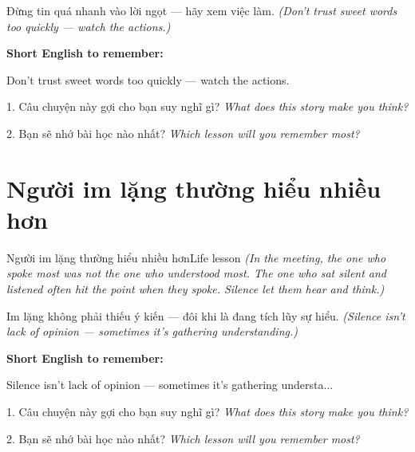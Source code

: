 \begin{baihoc}
Đừng tin quá nhanh vào lời ngọt — hãy xem việc làm.
\textit{(Don't trust sweet words too quickly — watch the actions.)}
\end{baihoc}

\begin{ghinhoanh}
\textbf{Short English to remember:}

Don't trust sweet words too quickly — watch the actions.

\end{ghinhoanh}

\begin{tuhocnhanh}
1. Câu chuyện này gợi cho bạn suy nghĩ gì? \textit{What does this story make you think?}

2. Bạn sẽ nhớ bài học nào nhất? \textit{Which lesson will you remember most?}
\end{tuhocnhanh}
\ngancach


\section{Người im lặng thường hiểu nhiều hơn}
\begin{truyen}{Người im lặng thường hiểu nhiều hơn}{Life lesson}
\textit{(In the meeting, the one who spoke most was not the one who understood most. The one who sat silent and listened often hit the point when they spoke. Silence let them hear and think.)}
\end{truyen}

\begin{baihoc}
Im lặng không phải thiếu ý kiến — đôi khi là đang tích lũy sự hiểu.
\textit{(Silence isn't lack of opinion — sometimes it's gathering understanding.)}
\end{baihoc}

\begin{ghinhoanh}
\textbf{Short English to remember:}

Silence isn't lack of opinion — sometimes it's gathering understa...

\end{ghinhoanh}

\begin{tuhocnhanh}
1. Câu chuyện này gợi cho bạn suy nghĩ gì? \textit{What does this story make you think?}

2. Bạn sẽ nhớ bài học nào nhất? \textit{Which lesson will you remember most?}
\end{tuhocnhanh}
\ngancach


